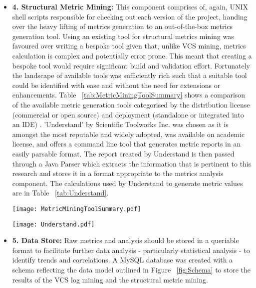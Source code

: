 \begin{itemize}
\item \textbf{4. Structural Metric Mining:} This component comprises of, again, UNIX shell scripts responsible for checking out each version of the project, handing over the heavy lifting of metrics generation to an out-of-the-box metrics generation tool. Using an existing tool for structural metrics mining was favoured over writing a bespoke tool given that, unlike VCS mining, metrics calculation is complex and potentially error prone. This meant that creating a bespoke tool would require significant build and validation effort. Fortunately the landscape of available tools was sufficiently rich such that a suitable tool could be identified with ease and without the need for extensions or enhancements. Table ~\ref{tab:MetricMiningToolSummary} shows a comparison of the available metric generation tools categorised by the distribution license (commercial or open source) and deployment (standalone or integrated into an IDE) \citep{spinellis2005tool, scitools, powersoftware, metricssourceforge, ndepend}. 'Understand' by Scientific Toolworks Inc. was chosen as it is amongst the most reputable and widely adopted, was available on academic license, and offers a command line tool that generates metric reports in an easily parsable format. The report created by Understand is then passed through a Java Parser which extracts the information that is pertinent to this research and stores it in a format appropriate to the metrics analysis component. The calculations used by Understand to generate metric values are in Table ~\ref{tab:Understand}.

\begin{table}
\centering 
{}
\begin{tabular}
 \centering 
 \texttt{[image: MetricMiningToolSummary.pdf]}
 \label{tab:MetricMiningToolSummary}
\end{tabular}
\end{table}

\begin{table}
\centering 
{}
\begin{tabular}
 \centering 
 \texttt{[image: Understand.pdf]}
 \label{tab:Understand}
\end{tabular}
\end{table}

\item \textbf{5. Data Store:} Raw metrics and analysis should be stored in a queriable format to facilitate further data analysis - particularly statistical analysis - to identify trends and correlations. A MySQL database was created with a schema reflecting the data model outlined in Figure ~\ref{fig:Schema} to store the results of the VCS log mining and the structural metric mining. 
 

\end{itemize}

